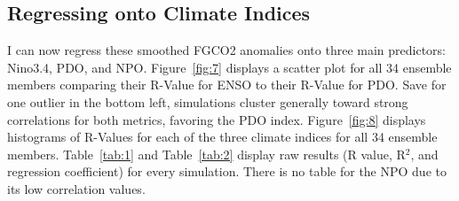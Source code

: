 \documentclass[12pt]{article}
\begin{document}
\subsection{Regressing onto Climate Indices}
I can now regress these smoothed FGCO2 anomalies onto three main predictors: Nino3.4, PDO, and NPO. Figure~\ref{fig:7} displays a scatter plot for all 34 ensemble members comparing their R-Value for ENSO to their R-Value for PDO. Save for one outlier in the bottom left, simulations cluster generally toward strong correlations for both metrics, favoring the PDO index. Figure~\ref{fig:8} displays histograms of R-Values for each of the three climate indices for all 34 ensemble members. Table~\ref{tab:1} and Table~\ref{tab:2} display raw results (R value, R$^{2}$, and regression coefficient) for every simulation. There is no table for the NPO due to its low correlation values.
\end{document}
